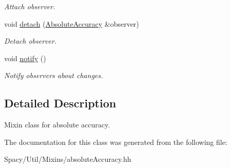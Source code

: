 \begin{DoxyCompactItemize}
\begin{DoxyCompactList}\small\item\em Attach observer. \end{DoxyCompactList}\item 
\hypertarget{classSpacy_1_1Mixin_1_1MixinConnection_adda739590c487679c26f60e50aedb73f}{}void \hyperlink{classSpacy_1_1Mixin_1_1MixinConnection_adda739590c487679c26f60e50aedb73f}{detach} (\hyperlink{classSpacy_1_1Mixin_1_1AbsoluteAccuracy}{Absolute\+Accuracy} \&observer)\label{classSpacy_1_1Mixin_1_1MixinConnection_adda739590c487679c26f60e50aedb73f}

\begin{DoxyCompactList}\small\item\em Detach observer. \end{DoxyCompactList}\item 
\hypertarget{classSpacy_1_1Mixin_1_1MixinConnection_a1ddeaa78a3bb4a38c2cca36d1f99fe36}{}void \hyperlink{classSpacy_1_1Mixin_1_1MixinConnection_a1ddeaa78a3bb4a38c2cca36d1f99fe36}{notify} ()\label{classSpacy_1_1Mixin_1_1MixinConnection_a1ddeaa78a3bb4a38c2cca36d1f99fe36}

\begin{DoxyCompactList}\small\item\em Notify observers about changes. \end{DoxyCompactList}\end{DoxyCompactItemize}


\subsection{Detailed Description}
Mixin class for absolute accuracy. 

The documentation for this class was generated from the following file\+:\begin{DoxyCompactItemize}
\item 
Spacy/\+Util/\+Mixins/absolute\+Accuracy.\+hh\end{DoxyCompactItemize}
